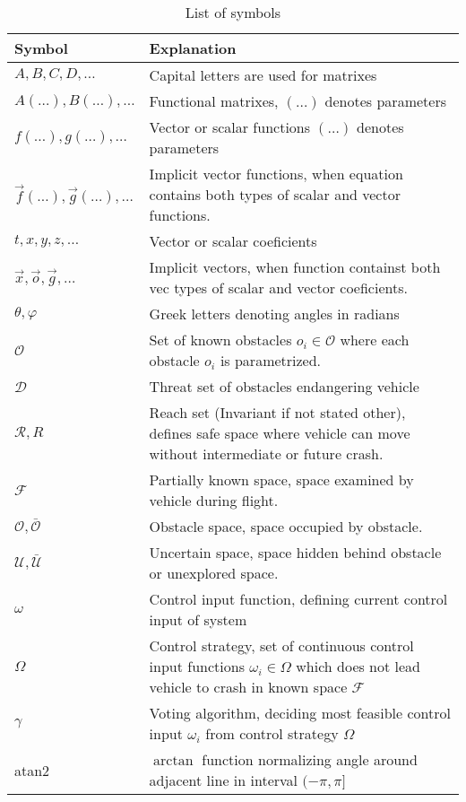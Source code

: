 \begin{table}[H]
    \centering
    \begin{tabularx}{\textwidth}{|l||X|}
    \hline
    Symbol & Explanation \\ \hline\hline
    $A,B,C,D,\dots$ & Capital letters are used for matrixes\\\hline
    $A(\dots),B(\dots),\dots$ & Functional matrixes, $(\dots)$ denotes parameters\\\hline
    $f(\dots),g(\dots),\dots$ & Vector or scalar functions $(\dots)$ denotes parameters\\\hline
    $\vec{f}(\dots),\vec{g}(\dots),\dots$ & Implicit vector functions, when equation contains both types of scalar and vector functions.\\\hline
    $t,x,y,z,\dots$ & Vector or scalar coeficients \\\hline
    $\vec{x},\vec{o},\vec{g},\dots$ & Implicit vectors, when function containst both vec types of scalar and vector coeficients.\\\hline
    $\theta,\varphi$ & Greek letters denoting angles in radians\\\hline
    $\mathscr{O}$ & Set of known obstacles $o_i\in\mathscr{O}$ where each obstacle $o_i$ is parametrized.\\\hline
    $\mathscr{D}$ & Threat set of obstacles endangering vehicle\\\hline
    $\mathscr{R},R$ & Reach set (Invariant if not stated other), defines safe space where vehicle can move without intermediate or future crash.\\\hline
    $\mathscr{F}$ & Partially known space, space examined by vehicle during flight.\\\hline
    $\mathscr{O},\bar{\mathscr{O}}$ & Obstacle space, space occupied by obstacle.\\\hline
    $\mathscr{U},\bar{\mathscr{U}}$& Uncertain space, space hidden behind obstacle or unexplored space.\\\hline
    $\omega$ & Control input function, defining current control input of system\\\hline
    $\Omega$ & Control strategy, set of continuous control input functions $\omega_i\in\Omega$ which does not lead vehicle to crash in known space $\mathscr{F}$\\\hline
    $\gamma$ & Voting algorithm, deciding most feasible control input $\omega_i$ from control strategy $\Omega$\\\hline
    \textnormal{atan2} & $\arctan$ function normalizing angle around adjacent line in interval $(-\pi,\pi]$\\ \hline 

    \end{tabularx} 
    \caption{List of symbols}
    \label{tab:symbols}
\end{table}